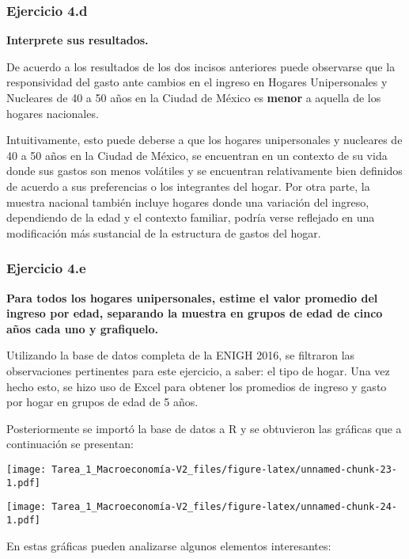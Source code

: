 \documentclass[
]{article}
\begin{document}
\hypertarget{ejercicio-4.d}{%
\subsubsection{Ejercicio 4.d}\label{ejercicio-4.d}}

\textbf{Interprete sus resultados.}

De acuerdo a los resultados de los dos incisos anteriores puede
observarse que la responsividad del gasto ante cambios en el ingreso en
Hogares Unipersonales y Nucleares de 40 a 50 años en la Ciudad de México
es \textbf{menor} a aquella de los hogares nacionales.

Intuitivamente, esto puede deberse a que los hogares unipersonales y
nucleares de 40 a 50 años en la Ciudad de México, se encuentran en un
contexto de su vida donde sus gastos son menos volátiles y se encuentran
relativamente bien definidos de acuerdo a sus preferencias o los
integrantes del hogar. Por otra parte, la muestra nacional también
incluye hogares donde una variación del ingreso, dependiendo de la edad
y el contexto familiar, podría verse reflejado en una modificación más
sustancial de la estructura de gastos del hogar.

\hypertarget{ejercicio-4.e}{%
\subsubsection{Ejercicio 4.e}\label{ejercicio-4.e}}

\textbf{Para todos los hogares unipersonales, estime el valor promedio
del ingreso por edad, separando la muestra en grupos de edad de cinco
años cada uno y grafiquelo.}

Utilizando la base de datos completa de la ENIGH 2016, se filtraron las
observaciones pertinentes para este ejercicio, a saber: el tipo de
hogar. Una vez hecho esto, se hizo uso de Excel para obtener los
promedios de ingreso y gasto por hogar en grupos de edad de 5 años.

Posteriormente se importó la base de datos a R y se obtuvieron las
gráficas que a continuación se presentan:

\texttt{[image: Tarea\_1\_Macroeconomía-V2\_files/figure-latex/unnamed-chunk-23-1.pdf]}

\texttt{[image: Tarea\_1\_Macroeconomía-V2\_files/figure-latex/unnamed-chunk-24-1.pdf]}

En estas gráficas pueden analizarse algunos elementos interesantes:
\end{document}
